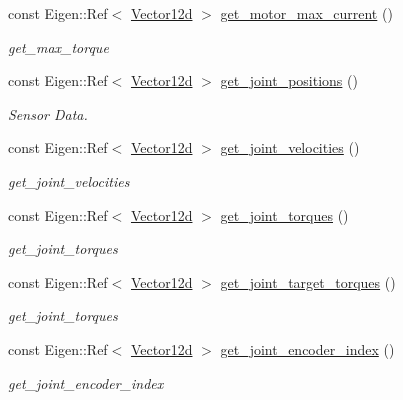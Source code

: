 \begin{DoxyCompactItemize}
const Eigen\+::\+Ref$<$ \hyperlink{common__header_8hpp_a80313eb420184518596e745eecf4b494}{Vector12d} $>$ \hyperlink{classblmc__robots_1_1Solo12_aa1994a07d52a00275e0c85f0ad38fb12}{get\+\_\+motor\+\_\+max\+\_\+current} ()
\begin{DoxyCompactList}\small\item\em get\+\_\+max\+\_\+torque \end{DoxyCompactList}\item 
const Eigen\+::\+Ref$<$ \hyperlink{common__header_8hpp_a80313eb420184518596e745eecf4b494}{Vector12d} $>$ \hyperlink{classblmc__robots_1_1Solo12_a6ce3b791bba7cc37621a63ee6447c9c0}{get\+\_\+joint\+\_\+positions} ()
\begin{DoxyCompactList}\small\item\em Sensor Data. \end{DoxyCompactList}\item 
const Eigen\+::\+Ref$<$ \hyperlink{common__header_8hpp_a80313eb420184518596e745eecf4b494}{Vector12d} $>$ \hyperlink{classblmc__robots_1_1Solo12_aa0a6eb846038b644b425c1efd4c8a81f}{get\+\_\+joint\+\_\+velocities} ()
\begin{DoxyCompactList}\small\item\em get\+\_\+joint\+\_\+velocities \end{DoxyCompactList}\item 
const Eigen\+::\+Ref$<$ \hyperlink{common__header_8hpp_a80313eb420184518596e745eecf4b494}{Vector12d} $>$ \hyperlink{classblmc__robots_1_1Solo12_acfc399c1070c44d4ae98a1d806dca783}{get\+\_\+joint\+\_\+torques} ()
\begin{DoxyCompactList}\small\item\em get\+\_\+joint\+\_\+torques \end{DoxyCompactList}\item 
const Eigen\+::\+Ref$<$ \hyperlink{common__header_8hpp_a80313eb420184518596e745eecf4b494}{Vector12d} $>$ \hyperlink{classblmc__robots_1_1Solo12_ab8a6277bddcd64ec33eb8720d9478f7d}{get\+\_\+joint\+\_\+target\+\_\+torques} ()
\begin{DoxyCompactList}\small\item\em get\+\_\+joint\+\_\+torques \end{DoxyCompactList}\item 
const Eigen\+::\+Ref$<$ \hyperlink{common__header_8hpp_a80313eb420184518596e745eecf4b494}{Vector12d} $>$ \hyperlink{classblmc__robots_1_1Solo12_a7569444864f60d87ba9d9d0b5cc01afe}{get\+\_\+joint\+\_\+encoder\+\_\+index} ()
\begin{DoxyCompactList}\small\item\em get\+\_\+joint\+\_\+encoder\+\_\+index \end{DoxyCompactList}\item 

\end{DoxyCompactItemize}
